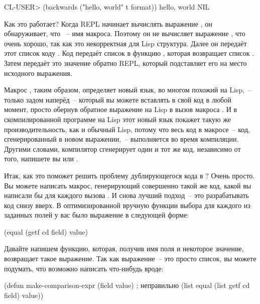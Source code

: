 \begin{myverb}
  CL-USER> (backwards ("hello, world" t format))
  hello, world
  NIL
\end{myverb}

Как это работает? Когда REPL начинает вычислять выражение , он
обнаруживает, что ~-- имя макроса. Поэтому он не вычисляет выражение
, что очень хорошо, так как это некорректная для Lisp
структура. Далее он передаёт этот список коду . Код 
передаёт список в функцию , которая возвращает список . Затем  передаёт это значение обратно REPL, который
подставляет его на место исходного выражения.

Макрос , таким образом, определяет новый язык, во многом похожий на
Lisp,~-- только задом наперёд~-- который вы можете вставлять в свой код в любой момент,
просто обернув обратное выражение на Lisp в вызов макроса . И в
скомпилированной программе на Lisp этот новый язык покажет такую же производительность,
как и обычный Lisp, потому что весь код в макросе~-- код, сгенерированный в новом
выражении,~-- выполняется во время компиляции. Другими словами, компилятор сгенерирует один
и тот же код, независимо от того, напишете вы 
или .

Итак, как это поможет решить проблему дублирующегося кода в ? Очень просто. Вы
можете написать макрос, генерирующий совершенно такой же код, какой вы написали бы для
каждого вызова . И снова лучший подход~-- это разрабатывать код снизу
вверх. В оптимизированной вручную функции выбора  для каждого из заданных
полей у вас было выражение в следующей форме:

\begin{myverb}
(equal (getf cd field) value)
\end{myverb}

Давайте напишем функцию, которая, получив имя поля и некоторое значение, возвращает такое
выражение. Так как выражение~-- это просто список, вы можете подумать, что возможно
написать что-нибудь вроде:

\begin{myverb}
(defun make-comparison-expr (field value)    ; неправильно
  (list equal (list getf cd field) value))
\end{myverb}

